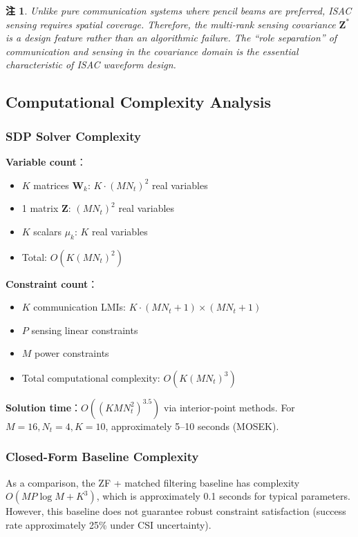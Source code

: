 \documentclass[12pt,a4paper]{article}
\newtheorem{remark}{注}
\newcommand{\mat}[1]{\mathbf{#1}}
\begin{document}
\begin{remark}
Unlike pure communication systems where pencil beams are preferred, ISAC sensing requires spatial coverage. Therefore, the multi-rank sensing covariance $\mat{Z}^*$ is a design feature rather than an algorithmic failure. The ``role separation'' of communication and sensing in the covariance domain is the essential characteristic of ISAC waveform design.
\end{remark}

\subsection{Computational Complexity Analysis}

\subsubsection{SDP Solver Complexity}

\textbf{Variable count}：
\begin{itemize}
    \item $K$ matrices $\mat{W}_k$: $K \cdot (MN_t)^2$ real variables
    \item 1 matrix $\mat{Z}$: $(MN_t)^2$ real variables
    \item $K$ scalars $\mu_k$: $K$ real variables
    \item Total: $O(K(MN_t)^2)$
\end{itemize}

\textbf{Constraint count}：
\begin{itemize}
    \item $K$ communication LMIs: $K \cdot (MN_t+1) \times (MN_t+1)$
    \item $P$ sensing linear constraints
    \item $M$ power constraints
    \item Total computational complexity: $O(K(MN_t)^3)$
\end{itemize}

\textbf{Solution time}：$O((K M N_t^2)^{3.5})$ via interior-point methods. For $M=16, N_t=4, K=10$, approximately 5--10 seconds (MOSEK).

\subsubsection{Closed-Form Baseline Complexity}

As a comparison, the ZF + matched filtering baseline has complexity $O(MP\log M + K^3)$, which is approximately 0.1 seconds for typical parameters. However, this baseline does not guarantee robust constraint satisfaction (success rate approximately 25\% under CSI uncertainty).
\end{document}

